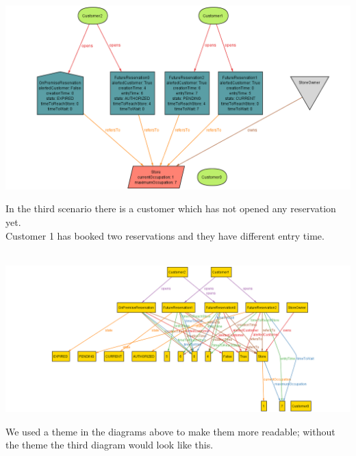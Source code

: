\begin{flushleft}
	\includegraphics[scale=0.4]{Images/Alloy_World3.png}
\end{flushleft}
In the third scenario there is a customer which has not opened any reservation yet.\\
Customer 1 has booked two reservations and they have different entry time.\\\\

\begin{flushleft}
	\includegraphics[scale=0.4]{Images/Alloy_World3_ugly.png}
\end{flushleft}
We used a theme in the diagrams above to make them more readable; without the theme the third diagram would look like this.



